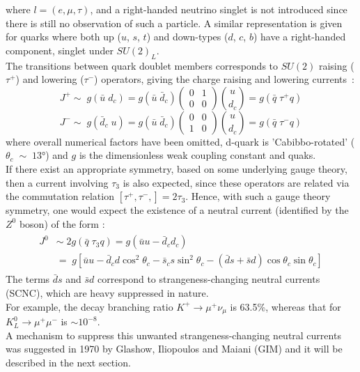 where $ l= (e,\mu,\tau)$, and a right-handed neutrino singlet is not introduced since there is still no observation of such a particle. A similar representation is given for
quarks where both up ($u$, $s$, $t$) and down-types ($d$, $c$, $b$) have a right-handed component, singlet under $SU(2)_L$.
\vspace{\baselineskip}
\\The transitions between quark doublet members corresponds to $SU(2)$ raising ($\tau^+$) and lowering ($\tau^-$) operators, giving the charge raising and lowering currents~\cite{renton}:
\begin{equation*}
J^{+} \sim \; g(\bar{u} \; d_{c}) = g(\bar{u} \; \bar{d}_{c})\left(\begin{array}{cc}  
																								0 & 1 \\ 
																								0 & 0
																								\end{array} \right)  \binom{u}{d_c} = g (\bar{q} \; \tau^{+}q)  
\end{equation*}
\begin{equation}
J^{-} \sim \; g(\bar{d}_c \; u) = g(\bar{u} \; \bar{d}_{c})\left(\begin{array}{cc}  
																								0 & 0 \\ 
																								1 & 0
																								\end{array} \right)  \binom{u}{d_c} = g (\bar{q} \; \tau^{-}q)  
\end{equation}
where overall numerical factors have been omitted, d-quark is 'Cabibbo-rotated' ($\theta_c\;\sim\; 13\si{\degree}$) and  $g$ is the dimensionless weak coupling constant and quaks.\\
If there exist an appropriate symmetry, based on some underlying gauge theory, then a current involving $\tau_3$ is also expected, since these operators are related via 
the commutation relation $\left[  \tau^{+}, \tau^{-}, \right] = 2\tau_3$. Hence, with such a gauge theory symmetry, one would expect the existence of a neutral current
(identified by the $Z^0$ boson) of the form :
\begin {align}
	\begin{split}
		J^{0} & \sim \; 2g (\bar{q} \; \tau_{3}q)  = g(\bar{u} u- \bar{d}_{c} d_{c}) \\
				& = \; g[ \bar{u} u- \bar{d}_{c} d \cos^{2}\theta_{c}  - \bar{s}_{c} s \sin^{2}\theta_{c} - (\bar{d} s + \bar{s} d) \cos\theta_{c}\sin\theta_{c}  ]
	\end{split}						
\end{align}
The terms $\bar{d} s$ and $\bar{s} d$ correspond to strangeness-changing neutral currents (SCNC), which are heavy suppressed in nature. \\
For example, the decay branching ratio $K^{+}\rightarrow \mu^{+} \nu_{\mu}$ is 63.5\%, whereas that for \\$K^{0}_{L}\rightarrow \mu^{+} \mu^{-}$ is $\sim 10^{-8}$.\\
A mechanism to suppress this unwanted strangeness-changing neutral currents was suggested in 1970 by Glashow, Iliopoulos and Maiani (GIM) and it will be described in the next section.

